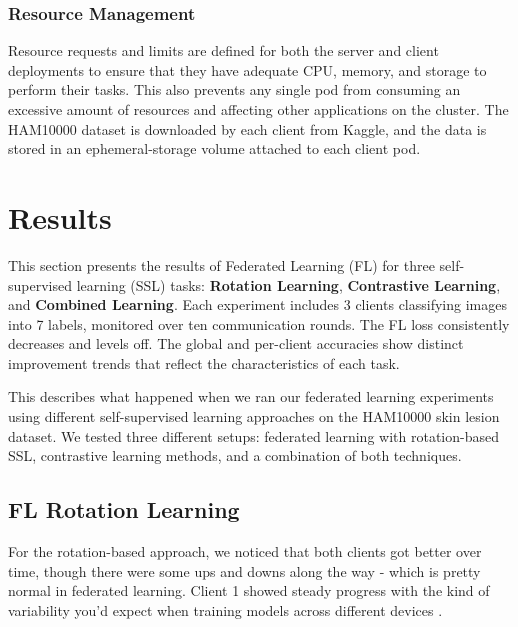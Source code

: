 \documentclass[a4paper, 10 pt, conference]{ieeeconf}
\begin{document}
\subsubsection{Resource Management}
Resource requests and limits are defined for both the server and client deployments to ensure that they have adequate CPU, memory, and storage to perform their tasks. This also prevents any single pod from consuming an excessive amount of resources and affecting other applications on the cluster. The HAM10000 dataset is downloaded by each client from Kaggle, and the data is stored in an ephemeral-storage volume attached to each client pod.


\section{Results}

This section presents the results of Federated Learning (FL) for three self-supervised learning (SSL) tasks: \textbf{Rotation Learning}, \textbf{Contrastive Learning}, and \textbf{Combined Learning}. Each experiment includes 3 clients  classifying images into 7 labels, monitored over ten communication rounds. The FL loss  consistently decreases and levels off. The global and per-client accuracies show distinct improvement trends that reflect the characteristics of each task.

This describes what happened when we ran our federated learning experiments using different self-supervised learning approaches on the HAM10000 skin lesion dataset. We tested three different setups: federated learning with rotation-based SSL, contrastive learning methods, and a combination of both techniques.

\subsection{FL Rotation Learning}

For the rotation-based approach, we noticed that both clients got better over time, though there were some ups and downs along the way - which is pretty normal in federated learning. Client 1 showed steady progress with the kind of variability you'd expect when training models across different devices .
\end{document}

